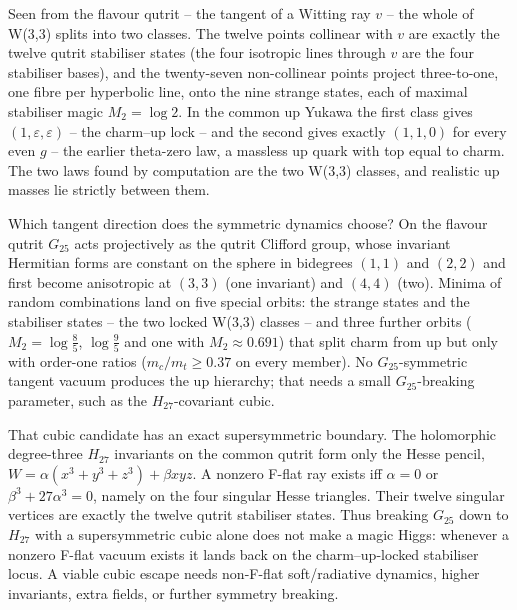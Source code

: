 Seen from the flavour qutrit -- the tangent of a Witting ray $v$ -- the whole of W(3,3) splits into two classes. The twelve points collinear with $v$ are exactly the twelve qutrit stabiliser states (the four isotropic lines through $v$ are the four stabiliser bases), and the twenty-seven non-collinear points project three-to-one, one fibre per hyperbolic line, onto the nine strange states, each of maximal stabiliser magic $M_2=\log2$. In the common up Yukawa the first class gives $(1,\varepsilon,\varepsilon)$ -- the charm--up lock -- and the second gives exactly $(1,1,0)$ for every even $g$ -- the earlier theta-zero law, a massless up quark with top equal to charm. The two laws found by computation are the two W(3,3) classes, and realistic up masses lie strictly between them. 

Which tangent direction does the symmetric dynamics choose? On the flavour qutrit $G_{25}$ acts projectively as the qutrit Clifford group, whose invariant Hermitian forms are constant on the sphere in bidegrees $(1,1)$ and $(2,2)$ and first become anisotropic at $(3,3)$ (one invariant) and $(4,4)$ (two). Minima of random combinations land on five special orbits: the strange states and the stabiliser states -- the two locked W(3,3) classes -- and three further orbits ($M_2=\log\tfrac85$, $\log\tfrac95$ and one with $M_2\approx0.691$) that split charm from up but only with order-one ratios ($m_c/m_t\ge0.37$ on every member). No $G_{25}$-symmetric tangent vacuum produces the up hierarchy; that needs a small $G_{25}$-breaking parameter, such as the $H_{27}$-covariant cubic. 

That cubic candidate has an exact supersymmetric boundary.  The holomorphic degree-three $H_{27}$ invariants on the common qutrit form only the Hesse pencil,
$W=\alpha(x^3+y^3+z^3)+\beta xyz$.  A nonzero F-flat ray exists iff $\alpha=0$ or $\beta^3+27\alpha^3=0$, namely on the four singular Hesse triangles.  Their twelve singular vertices are exactly the twelve qutrit stabiliser states.  Thus breaking $G_{25}$ down to $H_{27}$ with a supersymmetric cubic alone does not make a magic Higgs: whenever a nonzero F-flat vacuum exists it lands back on the charm--up-locked stabiliser locus.  A viable cubic escape needs non-F-flat soft/radiative dynamics, higher invariants, extra fields, or further symmetry breaking. 

